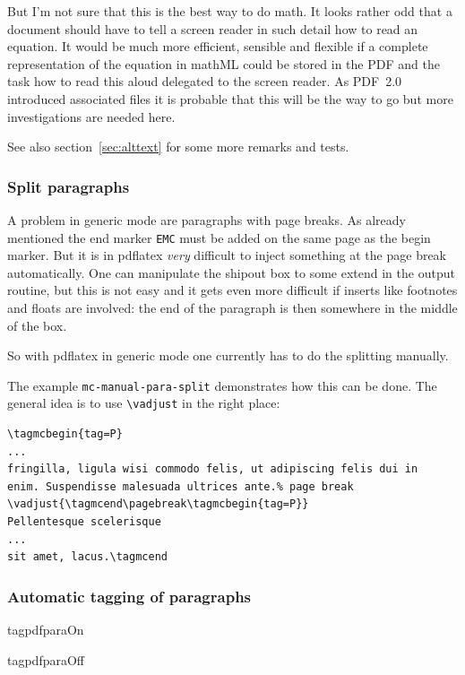 \documentclass[DIV=12,parskip=half-,bibliography=totoc]{scrartcl}
\newcommand\PDF{PDF}
\begin{document}
But I'm not sure that this is the best way to do math. It looks rather odd that a document should have to tell a screen reader in such detail how to read an equation. It would be much more efficient, sensible and flexible if a complete representation of the equation in mathML could be stored in the \PDF{} and the task how to read this aloud delegated to the screen reader. As \PDF{}~2.0 introduced associated files it is probable that this will be the way to go but more investigations are needed here.

See also section~\ref{sec:alttext} for some more remarks and tests.


\subsubsection{Split paragraphs}\label{sec:splitpara}


A problem in generic mode are paragraphs with page breaks.  As already mentioned the end marker \texttt{EMC} must be added on the same page as the begin marker. But it is in pdflatex \emph{very} difficult to inject something at the page break automatically. One can manipulate the shipout box to some extend in the output routine, but this is not easy and it gets even more difficult if inserts like footnotes and floats are involved: the end of the paragraph is then somewhere in the middle of the box.

So with pdflatex in generic mode one currently has to do the splitting manually.

The example \texttt{mc-manual-para-split} demonstrates how this can be done. The general idea is to use \verb+\vadjust+ in the right place:


\begin{lstlisting}
\tagmcbegin{tag=P}
...
fringilla, ligula wisi commodo felis, ut adipiscing felis dui in
enim. Suspendisse malesuada ultrices ante.% page break
\vadjust{\tagmcend\pagebreak\tagmcbegin{tag=P}}
Pellentesque scelerisque
...
sit amet, lacus.\tagmcend
\end{lstlisting}

\subsubsection{Automatic tagging of paragraphs}

\begin{docCommand}{tagpdfparaOn}{}\end{docCommand}
\begin{docCommand}{tagpdfparaOff}{}\end{docCommand}
\end{document}
